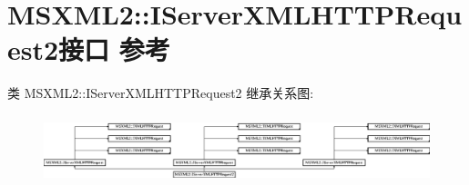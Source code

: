 \hypertarget{interface_m_s_x_m_l2_1_1_i_server_x_m_l_h_t_t_p_request2}{}\section{M\+S\+X\+M\+L2\+:\+:I\+Server\+X\+M\+L\+H\+T\+T\+P\+Request2接口 参考}
\label{interface_m_s_x_m_l2_1_1_i_server_x_m_l_h_t_t_p_request2}
类 M\+S\+X\+M\+L2\+:\+:I\+Server\+X\+M\+L\+H\+T\+T\+P\+Request2 继承关系图\+:\begin{figure}[H]
\begin{center}
\leavevmode
\includegraphics[height=2.028986cm]{interface_m_s_x_m_l2_1_1_i_server_x_m_l_h_t_t_p_request2}
\end{center}
\end{figure}
